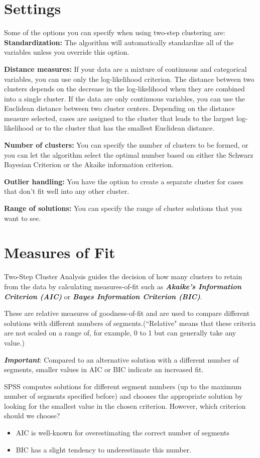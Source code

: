 \documentclass[a4paper,12pt]{article}
\begin{document}
\section*{Settings}
Some of the options you can specify when using two-step clustering are:
\textbf{Standardization:} The algorithm will automatically standardize all of the variables
unless you override this option.

\textbf{Distance measures:} If your data are a mixture of continuous and categorical variables,
you can use only the log-likelihood criterion. The distance between two clusters
depends on the decrease in the log-likelihood when they are combined into a single
cluster. If the data are only continuous variables, you can use the Euclidean
distance between two cluster centers. Depending on the distance measure selected,
cases are assigned to the cluster that leads to the largest log-likelihood or to the cluster
that has the smallest Euclidean distance.


\textbf{Number of clusters:} You can specify the number of clusters to be formed, or you can let
the algorithm select the optimal number based on either the Schwarz Bayesian
Criterion or the Akaike information criterion.


\textbf{Outlier handling:} You have the option to create a separate cluster for cases that don't fit
well into any other cluster.


\textbf{Range of solutions:} You can specify the range of cluster solutions that you want to see.


\section{Measures of Fit}
Two-Step Cluster Analysis guides the decision of how many clusters to retain from the data by
calculating measures-of-fit such as \textbf{\textit{Akaike’s Information Criterion (AIC)}} or \textbf{\textit{Bayes Information Criterion (BIC)}}.

These are relative measures of goodness-of-fit and are used to compare different
solutions with different numbers of segments.(``Relative" means that these criteria
are not scaled on a range of, for example, 0 to 1 but can generally take any value.)


\textbf{\textit{Important}}: Compared to an alternative solution with a different number of segments, smaller
values in AIC or BIC indicate an increased fit.


SPSS computes solutions for different segment numbers (up to the maximum number of segments specified before) and
chooses the appropriate solution by looking for the smallest value in the chosen
criterion. However, which criterion should we choose?
\begin{itemize}
	\item AIC is well-known for
	overestimating the correct number of segments
	\item BIC has a slight tendency
	to underestimate this number.
\end{itemize}
\end{document}
